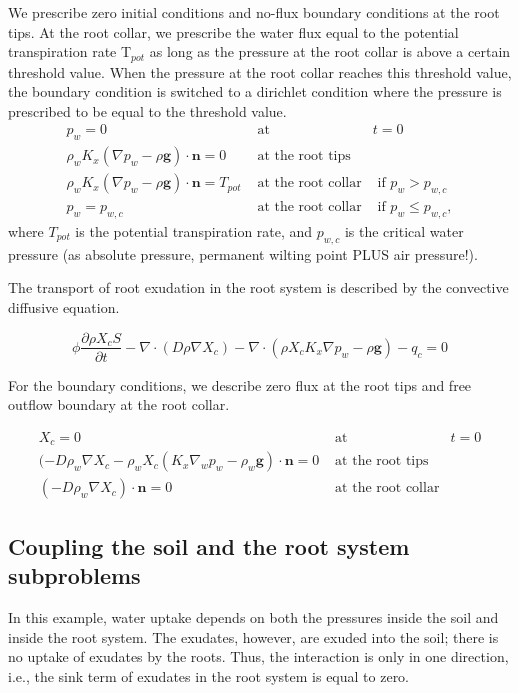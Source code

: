 We prescribe zero initial conditions and no-flux boundary conditions
at the root tips. At the root collar, we prescribe the water flux
equal to the potential transpiration rate T$_{pot}$ as long as the
pressure at the root collar is above a certain threshold value. When
the pressure at the root collar reaches this threshold value, the
boundary condition is switched to a dirichlet condition where the
pressure is prescribed to be equal to the threshold value.
\begin{eqnarray}
p_{w}=0 & \text{ at } & t=0\\
\rho_{w}K_{x}\left(\nabla p_{w}-\rho\boldsymbol{g}\right) \cdot \mathbf{n}=0 & \text{ at the root tips}\\
\rho_{w}K_{x}\left(\nabla p_{w}-\rho\boldsymbol{g}\right) \cdot \mathbf{n}=T_{pot} & \text{ at the root collar} & \text{ if }p_{w}>p_{w,c}\\
p_{w}=p_{w,c} & \text{ at the root collar} & \text{ if }p_{w}\le p_{w,c},
\end{eqnarray}
where $T_{pot}$ is the potential transpiration rate, and $p_{w,c}$
is the critical water pressure (as absolute pressure, permanent wilting
point PLUS air pressure!).

The transport of root exudation in the root system is described
by the convective diffusive equation.

\[
\phi\frac{\partial\rho X_{c}S}{\partial t}-\nabla \cdot (D\rho\nabla X_{c})-\nabla \cdot (\rho X_{c}K_{x}\nabla p_{w}-\rho\boldsymbol{g})-q_{c}=0
\]

For the boundary conditions, we describe zero flux at the root tips and free outflow boundary at the root collar.

\begin{eqnarray}
X_{c}=0 & \text{ at } & t=0\\
(-D\rho_w \nabla X_{c}-\rho_w X_{c}\left(K_{x}\nabla_w p_{w}-\rho_w\boldsymbol{g}\right)\cdot \mathbf{n}= 0 & \text{ at the root tips}\\
(-D\rho_w \nabla X_{c})\cdot \mathbf{n} = 0 & \text{ at the root collar}
\end{eqnarray}


\subsection*{Coupling the soil and the root system subproblems}

In this example, water uptake depends on both the pressures inside the soil and inside the root system. The exudates, however, are exuded into the soil; there is no uptake of exudates by the roots. Thus, the interaction is only in one direction, i.e., the sink term of exudates in the root system is equal to zero.

